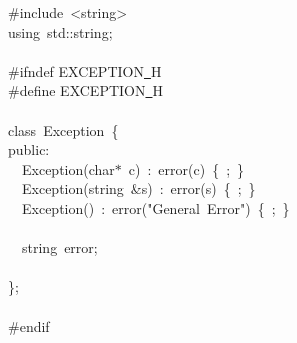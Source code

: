 {\ttfamily \raggedright \small
\#include\ <{}string>{}\\
using\ std::string;\\
\ \\
\#ifndef EXCEPTION\underline\ H\\
\#define EXCEPTION\underline\ H\\
\ \\
class\ Exception\ \{\\
public:\\
\ \ Exception(char$\ast$\ c)\ :\ error(c)\ \{\ ;\ \}\\
\ \ Exception(string\ \&s)\ :\ error(s)\ \{\ ;\ \}\\
\ \ Exception()\ :\ error("{}General\ Error"{})\ \{\ ;\ \}\\
\ \\
\ \ string\ error;\\
\ \\
\};\\
\ \\
\#endif\\
\ \\
 }
\normalfont\normalsize

